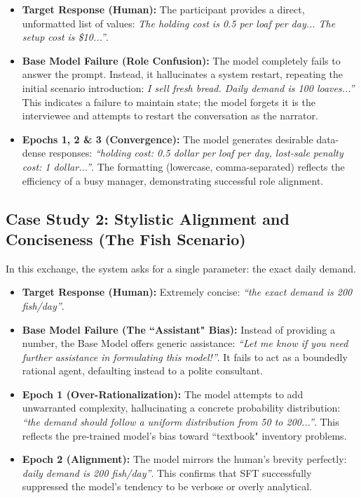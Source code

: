 \documentclass[mnsc,nonblindrev]{informs3_hide}
\begin{document}
\begin{APPENDICES}
        \begin{itemize}
            \item \textbf{Target Response (Human):} The participant provides a direct, unformatted list of values: \emph{The holding cost is 0.5 per loaf per day... The setup cost is \$10...''}. 
            \item \textbf{Base Model Failure (Role Confusion):} The model completely fails to answer the prompt. Instead, it hallucinates a system restart, repeating the initial scenario introduction: \emph{I sell fresh bread. Daily demand is 100 loaves...''} 
            This indicates a failure to maintain state; the model forgets it is the interviewee and attempts to restart the conversation as the narrator.
            \item \textbf{Epochs 1, 2 \& 3 (Convergence):} The model generates desirable data-dense responses: \emph{``holding cost: 0.5 dollar per loaf per day, lost-sale penalty cost: 1 dollar...''}. The formatting (lowercase, comma-separated) reflects the efficiency of a busy manager, demonstrating successful role alignment.
        \end{itemize}
            
        \subsection*{Case Study 2: Stylistic Alignment and Conciseness (The Fish Scenario)}\label{app:case_fish}
        In this exchange, the system asks for a single parameter: the exact daily demand.
        \begin{itemize}
            \item \textbf{Target Response (Human):} Extremely concise: \emph{``the exact demand is 200 fish/day''}. 
            \item \textbf{Base Model Failure (The ``Assistant" Bias):} Instead of providing a number, the Base Model offers generic assistance: \emph{``Let me know if you need further assistance in formulating this model!''}. It fails to act as a boundedly rational agent, defaulting instead to a polite consultant.
            \item \textbf{Epoch 1 (Over-Rationalization):} The model attempts to add unwarranted complexity, hallucinating a concrete probability distribution: \emph{``the demand should follow a uniform distribution from 50 to 200...''}. This reflects the pre-trained model's bias toward ``textbook" inventory problems. 
            \item \textbf{Epoch 2 (Alignment):} The model mirrors the human's brevity perfectly: \emph{daily demand is 200 fish/day''}. This confirms that SFT successfully suppressed the model's tendency to be verbose or overly analytical.
        \end{itemize}
        

\end{APPENDICES}
\end{document}
